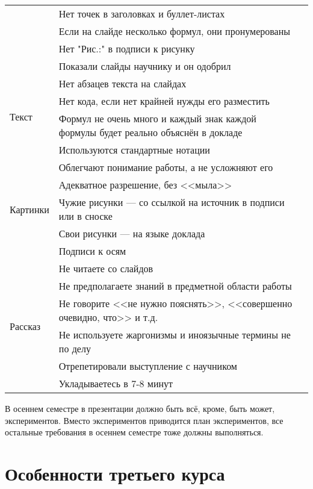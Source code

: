 \documentclass{article}
\begin{document}
\begin{tabular}{ |l|l|l| }
    & Нет точек в заголовках и буллет-листах & \\ \cline{2-3}
    & Если на слайде несколько формул, они пронумерованы & \\ \cline{2-3}
    & Нет "Рис.:" в подписи к рисунку & \\ \cline{2-3}
    & Показали слайды научнику и он одобрил & \\ \hline
    \multirow{4}{*}{Текст} & Нет абзацев текста на слайдах & \\ \cline{2-3}
    & Нет кода, если нет крайней нужды его разместить & \\ \cline{2-3}
    & Формул не очень много и каждый знак каждой формулы будет реально объяснён в докладе & \\ \cline{2-3}
    & Используются стандартные нотации & \\ \hline
    \multirow{5}{*}{Картинки} & Облегчают понимание работы, а не усложняют его & \\ \cline{2-3}
    & Адекватное разрешение, без <<мыла>> & \\ \cline{2-3}
    & Чужие рисунки --- со ссылкой на источник в подписи или в сноске & \\ \cline{2-3}
    & Свои рисунки --- на языке доклада & \\ \cline{2-3}
    & Подписи к осям & \\ \hline
    \multirow{6}{*}{Рассказ} & Не читаете со слайдов & \\ \cline{2-3}
    & Не предполагаете знаний в предметной области работы & \\ \cline{2-3}
    & Не говорите <<не нужно пояснять>>, <<совершенно очевидно, что>> и т.д.& \\ \cline{2-3}
    & Не используете жаргонизмы и иноязычные термины не по делу & \\ \cline{2-3}
    & Отрепетировали выступление с научником & \\ \cline{2-3}
    & Укладываетесь в 7-8 минут & \\ \hline
\end{tabular}

\newpage

В осеннем семестре в презентации должно быть всё, кроме, быть может, экспериментов. Вместо экспериментов приводится план экспериментов, все остальные требования в осеннем семестре тоже должны выполняться.

\section{Особенности третьего курса}
\end{document}
